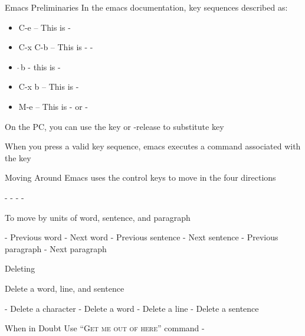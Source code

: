 \documentclass[newPxFont,sthlmFooter,nooffset]{beamer}
\begin{document}
\begin{frame}[t]{Emacs Preliminaries}
In the emacs documentation, key sequences described as:
\begin{itemize}
\item C-e – This is -
\item C-x C-b – This is - -
\item $\hat{~}$b - this is - \
\item C-x b – This is - 
\item M-e – This is \keystroke{Meta}-\keystroke{e} or -
\end{itemize}

\bigskip
On the PC, you can use the  key or -release to substitute  key

\bigskip
When you press a valid key sequence, emacs executes a command associated with the key
\end{frame}




\begin{frame}[t]{Moving Around}
Emacs uses the control keys to move in the four directions
\bigskip

- \keystroke{$\leftarrow$} \hfill
{}-\keystrokered{n} \keystroke{$\downarrow$} \hfill
{}-\keystrokered{p} \keystroke{$\uparrow$} \hfill
\keystrokered{Ctrl}-\keystrokered{f} \keystroke{$\rightarrow$} \hfill



\bigskip
To move by units of word, sentence, and paragraph

\bigskip
{}- Previous word \hfill
{}- Next word \hfill
{}- Previous sentence \hfill
{}- Next sentence \hfill
{}-\keystrokered{\{} Previous paragraph \hfill
\keystrokered{Meta}-\keystrokered{\}} Next paragraph \hfill


\end{frame}



\begin{frame}[t]{Deleting}

Delete a word, line, and sentence
\bigskip

\keystrokered{Ctrl}- Delete a character \hfill
{}-\keystrokered{d} Delete a word \hfill
{}- Delete a line \hfill
\keystrokered{Meta}-\keystrokered{k} Delete a sentence \hfill

\bigskip
\begin{block}{When in Doubt}
Use ``\textsc{Get me out of here}'' command \keystrokered{Ctrl}-\keystrokered{g} 
\end{block}
\end{frame}
\end{document}
